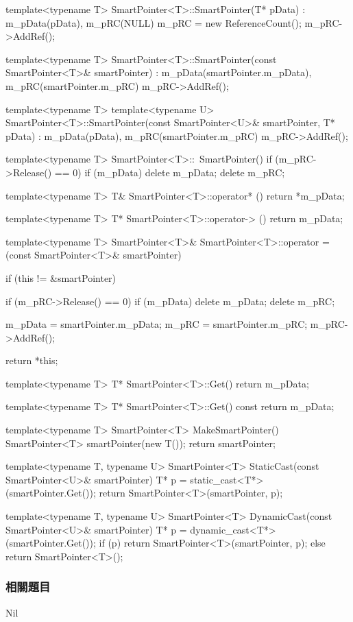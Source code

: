 \begin{Code}
template<typename T>
SmartPointer<T>::SmartPointer(T* pData)
    : m_pData(pData), m_pRC(NULL)
{
    m_pRC = new ReferenceCount();
    m_pRC->AddRef();
}

template<typename T>
SmartPointer<T>::SmartPointer(const SmartPointer<T>& smartPointer)
    : m_pData(smartPointer.m_pData), m_pRC(smartPointer.m_pRC)
{
    m_pRC->AddRef();
}

template<typename T>
template<typename U>
SmartPointer<T>::SmartPointer(const SmartPointer<U>& smartPointer, T* pData)
    : m_pData(pData), m_pRC(smartPointer.m_pRC)
{
    m_pRC->AddRef();
}

template<typename T>
SmartPointer<T>::~SmartPointer()
{
    if (m_pRC->Release() == 0)
    {
        if (m_pData)
            delete m_pData;
        delete m_pRC;
    }
}

template<typename T>
T& SmartPointer<T>::operator* ()
{
    return *m_pData;
}

template<typename T>
T* SmartPointer<T>::operator-> ()
{
    return m_pData;
}

template<typename T>
SmartPointer<T>& SmartPointer<T>::operator = (const SmartPointer<T>& smartPointer)
{
    if (this != &smartPointer)
    {
        if (m_pRC->Release() == 0)
        {
            if (m_pData)
                delete m_pData;
            delete m_pRC;
        }

        m_pData = smartPointer.m_pData;
        m_pRC = smartPointer.m_pRC;
        m_pRC->AddRef();
    }
    return *this;
}

template<typename T>
T* SmartPointer<T>::Get()
{
    return m_pData;
}

template<typename T>
T* SmartPointer<T>::Get() const
{
 return m_pData;
}

template<typename T>
SmartPointer<T> MakeSmartPointer()
{
    SmartPointer<T> smartPointer(new T());
    return smartPointer;
}

template<typename T, typename U>
SmartPointer<T> StaticCast(const SmartPointer<U>& smartPointer)
{
    T* p = static_cast<T*>(smartPointer.Get());
    return SmartPointer<T>(smartPointer, p);
}

template<typename T, typename U>
SmartPointer<T> DynamicCast(const SmartPointer<U>& smartPointer)
{
    T* p = dynamic_cast<T*>(smartPointer.Get());
    if (p)
        return SmartPointer<T>(smartPointer, p);
    else
        return SmartPointer<T>();
}
\end{Code}


\subsubsection{相關題目}
Nil
